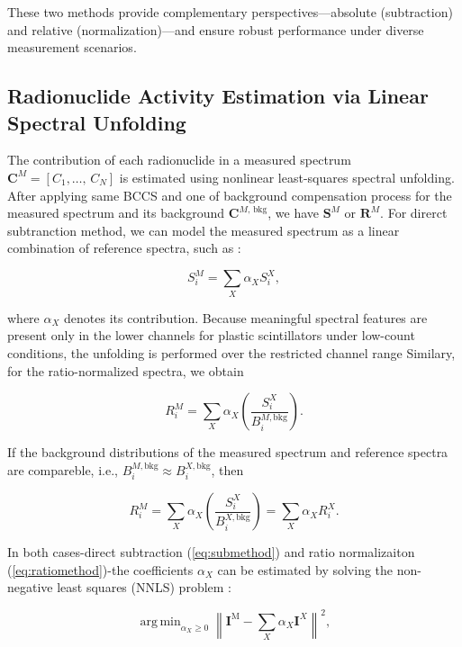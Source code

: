 \documentclass[10pt]{wlscirep}
\DeclareMathOperator*{\argmin}{arg\,min} %
\begin{document}
These two methods provide complementary perspectives—absolute (subtraction) and relative (normalization)—and ensure robust performance under diverse measurement scenarios.

\subsection*{Radionuclide Activity Estimation via Linear Spectral Unfolding}

The contribution of each radionuclide in a measured spectrum $\mathbf{C}^M=[C_1,\ldots,\,C_N]$ is estimated using nonlinear least-squares spectral unfolding. After applying same BCCS and one of background compensation process for the measured spectrum and its background $\mathbf{C}^{M,\,\text{bkg}}$, we have $\mathbf{S}^M$ or $\mathbf{R}^M$. For direrct subtranction method, we can model the measured spectrum as a linear combination of reference spectra, such as :

\begin{equation}
S_i^M = \sum_X \alpha_X S_i^X,\label{eq:submethod}
\end{equation}

\noindent where $\alpha_X$ denotes its contribution. Because meaningful spectral features are present only in the lower channels for plastic scintillators under low-count conditions, the unfolding is performed over the restricted channel range Similary, for the ratio-normalized spectra, we obtain

\begin{equation*}
R_i^M = \sum_X \alpha_X \left(\dfrac{S_i^X}{B_i^{M,\text{bkg}}}\right).
\end{equation*}

If the background distributions of the measured spectrum and reference spectra are compareble, i.e., $B^{M,\text{bkg}}_i \approx B_i^{X,\text{bkg}}$, then

\begin{equation}
R_i^M = \sum_X \alpha_X \left(\dfrac{S_i^X}{B_i^{X,\text{bkg}}}\right) = \sum_X \alpha_X R_i^X.\label{eq:ratiomethod}
\end{equation}

In both cases-direct subtraction (\ref{eq:submethod}) and ratio normalizaiton (\ref{eq:ratiomethod})-the coefficients $\alpha_X$ can be estimated by solving the non-negative least squares (NNLS) problem :

\begin{equation}
\argmin_{\alpha_X \ge 0} \left\| \textbf{I}^{\text{M}} - \sum_{X} \alpha_X \textbf{I}^{X}\right\|^2,\label{eqn:llns}
\end{equation}
\end{document}
